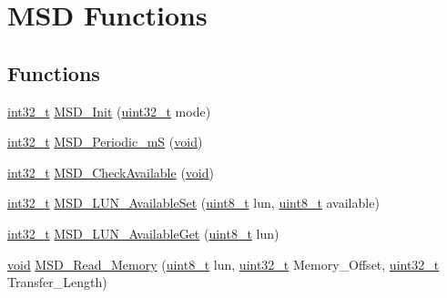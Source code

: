\hypertarget{group___m_s_d}{\section{M\-S\-D Functions}
\label{group___m_s_d}
}
\subsection*{Functions}
\begin{DoxyCompactItemize}
\item 
\hyperlink{group___n_a_m_e_gafd12020da5a235dfcf0c3c748fb5baed}{int32\-\_\-t} \hyperlink{group___m_s_d_gaa65646d56c03b02449cfa88f935413cc}{M\-S\-D\-\_\-\-Init} (\hyperlink{stdint_8h_a435d1572bf3f880d55459d9805097f62}{uint32\-\_\-t} mode)
\item 
\hyperlink{group___n_a_m_e_gafd12020da5a235dfcf0c3c748fb5baed}{int32\-\_\-t} \hyperlink{group___m_s_d_ga61f39b7349dc718473c13cadbdd09b21}{M\-S\-D\-\_\-\-Periodic\-\_\-m\-S} (\hyperlink{group___n_a_m_e_ga18028b8badbf1ea7e704ccac3c488e82}{void})
\item 
\hyperlink{group___n_a_m_e_gafd12020da5a235dfcf0c3c748fb5baed}{int32\-\_\-t} \hyperlink{group___m_s_d_gabfb46b3c47cc5d0447c7eb7ab8745045}{M\-S\-D\-\_\-\-Check\-Available} (\hyperlink{group___n_a_m_e_ga18028b8badbf1ea7e704ccac3c488e82}{void})
\item 
\hyperlink{group___n_a_m_e_gafd12020da5a235dfcf0c3c748fb5baed}{int32\-\_\-t} \hyperlink{group___m_s_d_ga3b62ad2225349ced1fabb015c4155026}{M\-S\-D\-\_\-\-L\-U\-N\-\_\-\-Available\-Set} (\hyperlink{stdint_8h_aba7bc1797add20fe3efdf37ced1182c5}{uint8\-\_\-t} lun, \hyperlink{stdint_8h_aba7bc1797add20fe3efdf37ced1182c5}{uint8\-\_\-t} available)
\item 
\hyperlink{group___n_a_m_e_gafd12020da5a235dfcf0c3c748fb5baed}{int32\-\_\-t} \hyperlink{group___m_s_d_gae219ec2868991987c3aab8c17681401e}{M\-S\-D\-\_\-\-L\-U\-N\-\_\-\-Available\-Get} (\hyperlink{stdint_8h_aba7bc1797add20fe3efdf37ced1182c5}{uint8\-\_\-t} lun)
\item 
\hyperlink{group___n_a_m_e_ga18028b8badbf1ea7e704ccac3c488e82}{void} \hyperlink{group___m_s_d_gaa539545834e47e46beec981712dc30f2}{M\-S\-D\-\_\-\-Read\-\_\-\-Memory} (\hyperlink{stdint_8h_aba7bc1797add20fe3efdf37ced1182c5}{uint8\-\_\-t} lun, \hyperlink{stdint_8h_a435d1572bf3f880d55459d9805097f62}{uint32\-\_\-t} Memory\-\_\-\-Offset, \hyperlink{stdint_8h_a435d1572bf3f880d55459d9805097f62}{uint32\-\_\-t} Transfer\-\_\-\-Length)
\item 

\end{DoxyCompactItemize}
